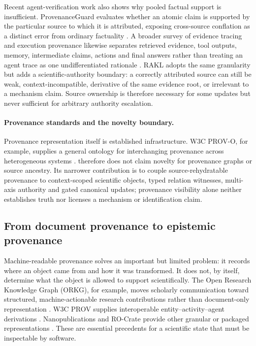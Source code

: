 Recent agent-verification work also shows why pooled factual support is insufficient. ProvenanceGuard evaluates whether an atomic claim is supported by the particular source to which it is attributed, exposing cross-source conflation as a distinct error from ordinary factuality \cite{alvarez2026provenanceguard}. A broader survey of evidence tracing and execution provenance likewise separates retrieved evidence, tool outputs, memory, intermediate claims, actions and final answers rather than treating an agent trace as one undifferentiated rationale \cite{wang2026traces}. RAKL adopts the same granularity but adds a scientific-authority boundary: a correctly attributed source can still be weak, context-incompatible, derivative of the same evidence root, or irrelevant to a mechanism claim. Source ownership is therefore necessary for some updates but never sufficient for arbitrary authority escalation.

\paragraph{Provenance standards and the novelty boundary.}
Provenance representation itself is established infrastructure. W3C PROV-O, for example, supplies a general ontology for interchanging provenance across heterogeneous systems \cite{w3cprov2013}. \RAKL{} therefore does not claim novelty for provenance graphs or source ancestry. Its narrower contribution is to couple source-rehydratable provenance to context-scoped scientific objects, typed relation witnesses, multi-axis authority and gated canonical updates; provenance visibility alone neither establishes truth nor licenses a mechanism or identification claim.

\subsection{From document provenance to epistemic provenance}

Machine-readable provenance solves an important but limited problem: it records where an object came from and how it was transformed. It does not, by itself, determine what the object is allowed to support scientifically. The Open Research Knowledge Graph (ORKG), for example, moves scholarly communication toward structured, machine-actionable research contributions rather than document-only representation \cite{jaradeh2019orkg}. W3C PROV supplies interoperable entity--activity--agent derivations \cite{w3cprov2013}. Nanopublications and RO-Crate provide other granular or packaged representations \cite{kuhn2018,soilandreyes2022}. These are essential precedents for a scientific state that must be inspectable by software.

